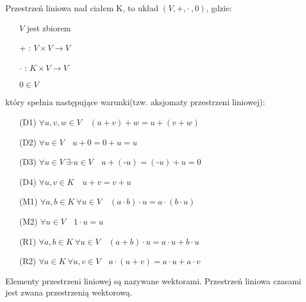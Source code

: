\begin{df}
Przestrzeń liniowa nad ciałem K, to układ $(V,+,\cdot\ ,0)$, gdzie:
\begin{itemize}
        \item[] $V$ jest zbiorem
        \item[+]: $V \times V \rightarrow V$
        \item[$\cdot$]: $K \times V \rightarrow V$
        \item[] $0 \in V$
    \end{itemize}
    który spełnia następujące warunki(tzw. aksjomaty przestrzeni liniowej):
    \begin{itemize}
        \item[(D1)] $\forall u, v, w \in V \quad (u+v)+w = u + (v+w)$
        \item[(D2)] $\forall u \in V \quad u+0 = 0+u = u$
        \item[(D3)] $\forall u \in V \ \exists \text{-}u \in V \quad u + (\text{-}u) = (\text{-}u) + u = 0$
        \item[(D4)] $\forall u, v \in K \quad u+v = v+u$
        \item[(M1)] $\forall a, b \in K\  \forall u \in V \quad (a\cdot b)\cdot u = a\cdot (b\cdot u) $
        \item[(M2)] $\forall u \in V \quad 1\cdot u = u$
        \item[(R1)] $ \forall a,b \in K\ \forall u \in V \quad (a+b)\cdot u = a\cdot u + b\cdot u $
        \item[(R2)] $ \forall a \in K\ \forall u,v \in V \quad a\cdot (u+v) = a\cdot u + a\cdot v $
    \end{itemize}
    \vspace{5mm}
    Elementy przestrzeni liniowej są nazywane wektorami.
    Przestrzeń liniowa czasami jest zwana przestrzenią wektorową.
\end{df}

